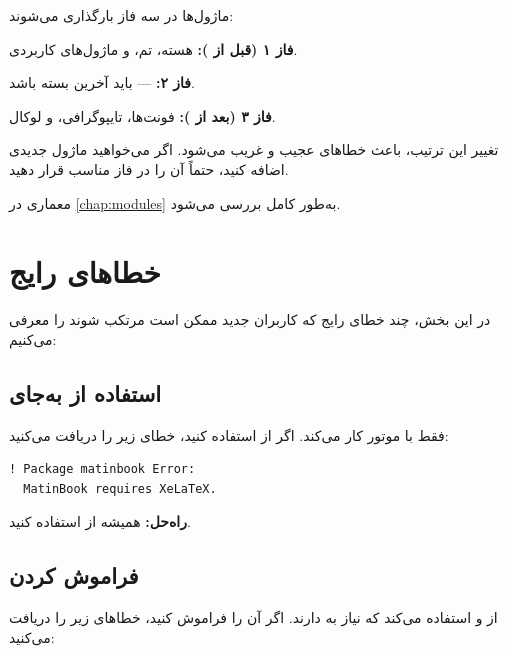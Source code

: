ماژول‌ها در سه فاز بارگذاری می‌شوند:

\textbf{فاز ۱ (قبل از ):}
هسته، تم، و ماژول‌های کاربردی.

\textbf{فاز ۲:}
 — باید آخرین بسته باشد.

\textbf{فاز ۳ (بعد از ):}
فونت‌ها، تایپوگرافی، و لوکال.

\begin{remark}
    تغییر این ترتیب، باعث خطاهای عجیب و غریب
    می‌شود. اگر می‌خواهید ماژول جدیدی اضافه
    کنید، حتماً آن را در فاز مناسب قرار دهید.
    \label{rem:loading-order}
\end{remark}

معماری  در \cref{chap:modules}
به‌طور کامل بررسی می‌شود.

\section{خطاهای رایج}
\label{sec:introduction-mistakes}

در این بخش، چند خطای رایج که کاربران جدید
 ممکن است مرتکب شوند را
معرفی می‌کنیم:

\subsection{استفاده از  به‌جای }
\label{sec:introduction-mistake-engine}

 فقط با موتور  کار
می‌کند. اگر از  استفاده کنید،
خطای زیر را دریافت می‌کنید:

\begin{latin}
\begin{verbatim}
! Package matinbook Error:
  MatinBook requires XeLaTeX.
\end{verbatim}
\end{latin}


\textbf{راه‌حل:} همیشه از  استفاده
کنید.

\subsection{فراموش کردن }
\label{sec:introduction-mistake-shellescape}

 از  و 
استفاده می‌کند که نیاز به 
دارند. اگر آن را فراموش کنید، خطاهای زیر
را دریافت می‌کنید:

